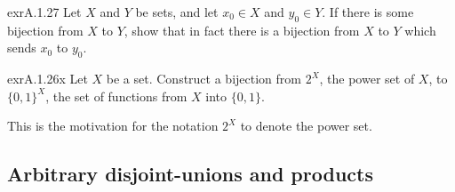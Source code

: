 \begin{exr}{}{exrA.1.27}
Let $X$ and $Y$ be sets, and let $x_0\in X$ and $y_0\in Y$.  If there is some bijection from $X$ to $Y$, show that in fact there is a bijection from $X$ to $Y$ which sends $x_0$ to $y_0$.
\end{exr}
\begin{exr}{}{exrA.1.26x}
Let $X$ be a set.  Construct a bijection from $2^X$, the power set of $X$, to $\{ 0,1\}^X$, the set of functions from $X$ into $\{ 0,1\}$.
\begin{rmk}
This is the motivation for the notation $2^X$ to denote the power set.
\end{rmk}
\end{exr}

\subsection{Arbitrary disjoint-unions and products}

